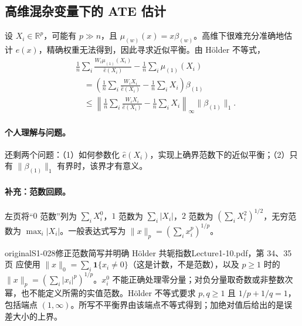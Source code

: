\subsection{高维混杂变量下的 ATE 估计}
设 $X_i\in\mathbb R^p$，可能有 $p\gg n$，且 $\mu_{(w)}(x)=x\beta_{(w)}$。高维下很难充分准确地估计 $e(x)$，精确权重无法得到，因此寻求近似平衡。由 Hölder 不等式，
\begin{align*}
&\frac1n\sum_i\frac{W_i\mu_{(1)}(X_i)}{\widehat e(X_i)}-\frac1n\sum_i\mu_{(1)}(X_i)\\
&\quad=\left(\frac1n\sum_i\frac{W_iX_i}{\widehat e(X_i)}-\frac1n\sum_iX_i\right)\beta_{(1)}\\
&\quad\leq\left\|\frac1n\sum_i\frac{W_iX_i}{\widehat e(X_i)}-\frac1n\sum_iX_i\right\|_\infty\|\beta_{(1)}\|_1.
\end{align*}
\paragraph{个人理解与问题。}
还剩两个问题：（1）如何参数化 $\widehat e(X_i)$，实现上确界范数下的近似平衡；（2）只有 $\|\beta_{(1)}\|_1$ 有界时，该界才有意义。
\paragraph{补充：范数回顾。}
左页将“$0$ 范数”列为 $\sum_iX_i^0$，$1$ 范数为 $\sum_i|X_i|$，$2$ 范数为 $(\sum_iX_i^2)^{1/2}$，无穷范数为 $\max_i|X_i|$。一般表达式写为 $\|x\|_p=(\sum_i x_i^p)^{1/p}$。
\begin{reviewnote}{original}{S1-028}{修正范数简写并明确 Hölder 共轭指数}{Lecture1-10.pdf，第 34、35 页}
应使用 $\|x\|_0=\sum_i\mathbf1\{x_i\ne0\}$（这是计数，不是范数），以及 $p\ge1$ 时的 $\|x\|_p=(\sum_i|x_i|^p)^{1/p}$。$x_i^0$ 不能正确处理零分量；对负分量取奇数或非整数次幂，也不能定义所需的实值范数。Hölder 不等式要求 $p,q\ge1$ 且 $1/p+1/q=1$，包括端点 $(1,\infty)$。所写不平衡界由该端点不等式得到；加绝对值后给出的是误差大小的上界。
\end{reviewnote}


